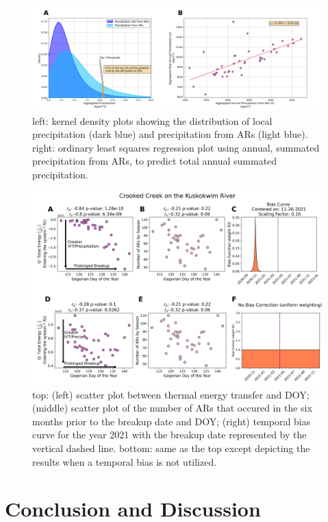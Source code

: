 \documentclass[12pts,draft]{AR_analysis_}
\begin{document}
\begin{figure}
\centering
\includegraphics[width=1.0\textwidth]{./images/concatenated_precip_var_plots.png}
\caption{left: kernel density plots showing the distribution of
	local precipitation (dark blue) and precipitation from ARs
	(light blue). right: ordinary least squares regression plot
	using annual, summated precipitation from ARs, to predict total annual
	summated precipitation.}
\label{fig:concatenated_precip_var_plots}
\end{figure}

\begin{figure}[H]
\centering
\includegraphics[width=1.0\textwidth]{./images/concatenated_scatter_bias_plots.png}
	\caption{top: (left) scatter plot between thermal energy
	transfer and DOY; (middle) scatter plot of the number of ARs
	that occured in the six months prior to the breakup date and
	DOY; 
	(right) temporal bias curve for the year 2021 with the breakup
	date represented by the vertical dashed line. bottom: same as
	the top except depicting the results when a temporal bias
	is not utilized.}
\label{fig:concatenated_corr_plots}
\end{figure}

\section{Conclusion and Discussion}
\end{document}
